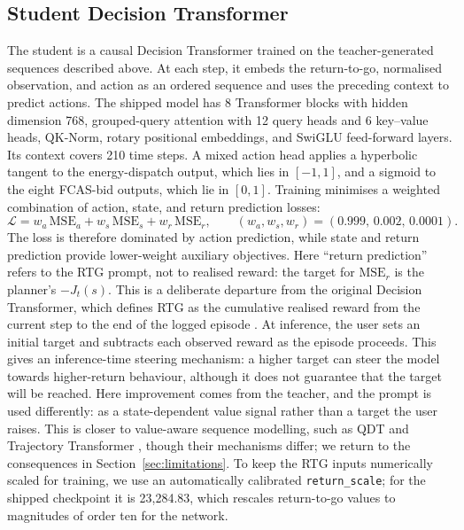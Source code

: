 \documentclass{article}
\begin{document}
\subsection{Student Decision Transformer}

The student is a causal Decision Transformer trained on the teacher-generated
sequences described above. At each step, it embeds the return-to-go, normalised
observation, and action as an ordered sequence and uses the preceding context
to predict actions. The shipped model has 8 Transformer blocks with hidden
dimension 768, grouped-query attention with 12 query heads and 6 key--value
heads, QK-Norm, rotary positional embeddings, and SwiGLU feed-forward layers.
Its context covers 210 time steps. A mixed action head applies a hyperbolic
tangent to the energy-dispatch output, which lies in $[-1,1]$, and a sigmoid to
the eight FCAS-bid outputs, which lie in $[0,1]$. Training minimises a
weighted combination of action, state, and return prediction losses:
\begin{equation}
  \mathcal{L}
  = w_a\,\mathrm{MSE}_a
  + w_s\,\mathrm{MSE}_s
  + w_r\,\mathrm{MSE}_r,
  \qquad
  (w_a,w_s,w_r)=(0.999,\,0.002,\,0.0001).
\end{equation}
The loss is therefore dominated by action prediction, while state and return
prediction provide lower-weight auxiliary objectives. Here ``return
prediction'' refers to the RTG prompt, not to realised reward: the target for
$\mathrm{MSE}_r$ is the planner's $-J_t(s)$. This is a deliberate departure
from the original Decision Transformer, which defines RTG as the cumulative
realised reward from the current step to the end of the logged episode
\citep{chen2021decision}. At inference, the user sets an initial target and
subtracts each observed reward as the episode proceeds. This gives an
inference-time steering mechanism: a higher target can steer the model towards
higher-return behaviour, although it does not guarantee that the target will be
reached. Here improvement comes from the
teacher, and the prompt is used differently: as a state-dependent value signal
rather than a target the user raises. This is closer to value-aware sequence
modelling, such as QDT and Trajectory Transformer
\citep{yamagata2023qdt,janner2021offline}, though their mechanisms differ; we
return to the consequences in Section~\ref{sec:limitations}.
To keep the RTG inputs
numerically scaled for training, we use an automatically calibrated
\texttt{return\_scale}; for the shipped checkpoint it is 23{,}284.83, which
rescales return-to-go values to magnitudes of order ten for the network.
\end{document}
